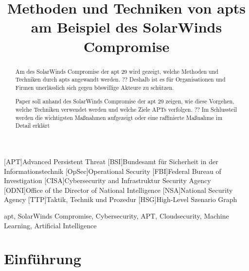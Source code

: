 \documentclass[conference]{IEEEtran}
\begin{document}
\begin{acronym}
    [APT]{Advanced Persistent Threat}
    [BSI]{Bundesamt für Sicherheit in der Informationstechnik}
    [OpSec]{Operational Security}
    [FBI]{Federal Bureau of Investigation}
    [CISA]{Cybersecurity and Infrastruktur Security Agency}
    [ODNI]{Office of the Director of National Intelligence}
    [NSA]{National Security Agency}
    [TTP]{Taktik, Technik und Prozedur}
    [HSG]{High-Level Szenario Graph}
\end{acronym}


\title{Methoden und Techniken von \aclp*{apt} am Beispiel des SolarWinds Compromise
}

\author{
}

\maketitle

\begin{abstract}
    Am des SolarWinds Compromise der \acs*{apt} 29 wird gezeigt, welche Methoden und Techniken durch \acsp*{apt} angewandt werden.
    ?? Deshalb ist es für Organisationen und Firmen unerlässlich sich gegen böswillige Akteure zu schützen.

    Paper soll anhand des SolarWinds Compromise der \ac{apt} 29 zeigen, wie diese Vorgehen, welche Techniken verwendet werden und welche Ziele APTs verfolgen.
    ?? Im Schlussteil werden die wichtigsten Maßnahmen aufgezeigt oder eine raffinierte Maßnahme im Detail erklärt
\end{abstract}

\begin{IEEEkeywords}
    \ac{apt}, SolarWinds Compromise, Cybersecurity, APT, Cloudsecurity, Machine Learning, Artificial Intelligence
\end{IEEEkeywords}

\section{Einführung}
\label{sec:introduction}
\end{document}
